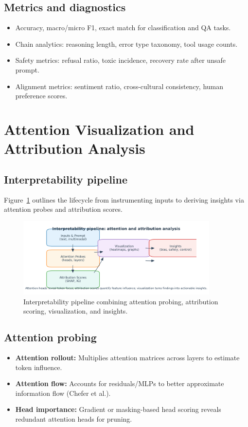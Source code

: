 \documentclass{article}
\begin{document}
\subsection{Metrics and diagnostics}
\begin{itemize}
  \item Accuracy, macro/micro F1, exact match for classification and QA tasks.
  \item Chain analytics: reasoning length, error type taxonomy, tool usage counts.
  \item Safety metrics: refusal ratio, toxic incidence, recovery rate after unsafe prompt.
  \item Alignment metrics: sentiment ratio, cross-cultural consistency, human preference scores.
\end{itemize}

\section{Attention Visualization and Attribution Analysis}
\subsection{Interpretability pipeline}
Figure~\ref{fig:interpretability_pipeline_en} outlines the lifecycle from instrumenting inputs to deriving insights via attention probes and attribution scores.
\begin{figure}[H]
  \centering
  \includegraphics[width=0.9\textwidth]{interpretability_pipeline.png}
  \caption{Interpretability pipeline combining attention probing, attribution scoring, visualization, and insights.}
  \label{fig:interpretability_pipeline_en}
\end{figure}

\subsection{Attention probing}
\begin{itemize}
  \item \textbf{Attention rollout:} Multiplies attention matrices across layers to estimate token influence.
  \item \textbf{Attention flow:} Accounts for residuals/MLPs to better approximate information flow (Chefer et al.).
  \item \textbf{Head importance:} Gradient or masking-based head scoring reveals redundant attention heads for pruning.
\end{itemize}
\end{document}

